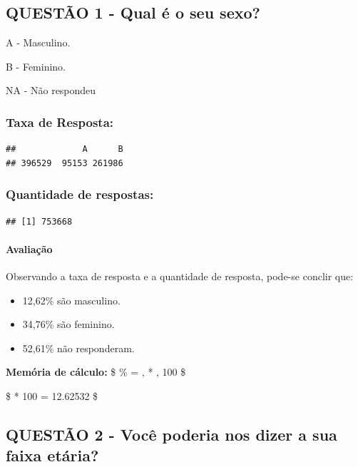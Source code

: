\documentclass[]{article}
\providecommand{\tightlist}{%
  \setlength{\itemsep}{0pt}\setlength{\parskip}{0pt}}
\let\oldparagraph\paragraph
\renewcommand{\paragraph}[1]{\oldparagraph{#1}\mbox{}}
\begin{document}
\hypertarget{questao-1---qual-e-o-seu-sexo}{%
\subsection{QUESTÃO 1 - Qual é o seu
sexo?}\label{questao-1---qual-e-o-seu-sexo}}

A - Masculino.

B - Feminino.

NA - Não respondeu

\hypertarget{taxa-de-resposta}{%
\subsubsection{Taxa de Resposta:}\label{taxa-de-resposta}}

\begin{verbatim}
##             A      B 
## 396529  95153 261986
\end{verbatim}

\hypertarget{quantidade-de-respostas}{%
\subsubsection{Quantidade de respostas:}\label{quantidade-de-respostas}}

\begin{verbatim}
## [1] 753668
\end{verbatim}

\hypertarget{avaliacao}{%
\paragraph{Avaliação}\label{avaliacao}}

Observando a taxa de resposta e a quantidade de resposta, pode-se
conclir que:

\begin{itemize}
\tightlist
\item
  12,62\% são masculino.
\item
  34,76\% são feminino.
\item
  52,61\% não responderam.
\end{itemize}

\textbf{Memória de cálculo:} \$ \% =
 , * ,
100 \$

\$  * 100 = 12.62532 \$

\hypertarget{questao-2---voce-poderia-nos-dizer-a-sua-faixa-etaria}{%
\subsection{QUESTÃO 2 - Você poderia nos dizer a sua faixa
etária?}\label{questao-2---voce-poderia-nos-dizer-a-sua-faixa-etaria}}
\end{document}
